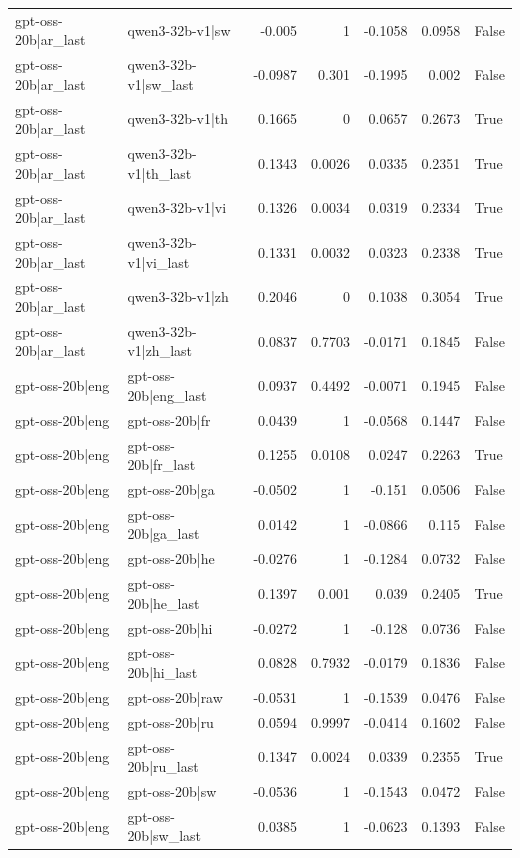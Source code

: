 \begin{table}
\begin{tabular}{l l r r r r l}
gpt-oss-20b|ar_last & qwen3-32b-v1|sw & -0.005 & 1 & -0.1058 & 0.0958 & False \\
gpt-oss-20b|ar_last & qwen3-32b-v1|sw_last & -0.0987 & 0.301 & -0.1995 & 0.002 & False \\
gpt-oss-20b|ar_last & qwen3-32b-v1|th & 0.1665 & 0 & 0.0657 & 0.2673 & True \\
gpt-oss-20b|ar_last & qwen3-32b-v1|th_last & 0.1343 & 0.0026 & 0.0335 & 0.2351 & True \\
gpt-oss-20b|ar_last & qwen3-32b-v1|vi & 0.1326 & 0.0034 & 0.0319 & 0.2334 & True \\
gpt-oss-20b|ar_last & qwen3-32b-v1|vi_last & 0.1331 & 0.0032 & 0.0323 & 0.2338 & True \\
gpt-oss-20b|ar_last & qwen3-32b-v1|zh & 0.2046 & 0 & 0.1038 & 0.3054 & True \\
gpt-oss-20b|ar_last & qwen3-32b-v1|zh_last & 0.0837 & 0.7703 & -0.0171 & 0.1845 & False \\
gpt-oss-20b|eng & gpt-oss-20b|eng_last & 0.0937 & 0.4492 & -0.0071 & 0.1945 & False \\
gpt-oss-20b|eng & gpt-oss-20b|fr & 0.0439 & 1 & -0.0568 & 0.1447 & False \\
gpt-oss-20b|eng & gpt-oss-20b|fr_last & 0.1255 & 0.0108 & 0.0247 & 0.2263 & True \\
gpt-oss-20b|eng & gpt-oss-20b|ga & -0.0502 & 1 & -0.151 & 0.0506 & False \\
gpt-oss-20b|eng & gpt-oss-20b|ga_last & 0.0142 & 1 & -0.0866 & 0.115 & False \\
gpt-oss-20b|eng & gpt-oss-20b|he & -0.0276 & 1 & -0.1284 & 0.0732 & False \\
gpt-oss-20b|eng & gpt-oss-20b|he_last & 0.1397 & 0.001 & 0.039 & 0.2405 & True \\
gpt-oss-20b|eng & gpt-oss-20b|hi & -0.0272 & 1 & -0.128 & 0.0736 & False \\
gpt-oss-20b|eng & gpt-oss-20b|hi_last & 0.0828 & 0.7932 & -0.0179 & 0.1836 & False \\
gpt-oss-20b|eng & gpt-oss-20b|raw & -0.0531 & 1 & -0.1539 & 0.0476 & False \\
gpt-oss-20b|eng & gpt-oss-20b|ru & 0.0594 & 0.9997 & -0.0414 & 0.1602 & False \\
gpt-oss-20b|eng & gpt-oss-20b|ru_last & 0.1347 & 0.0024 & 0.0339 & 0.2355 & True \\
gpt-oss-20b|eng & gpt-oss-20b|sw & -0.0536 & 1 & -0.1543 & 0.0472 & False \\
gpt-oss-20b|eng & gpt-oss-20b|sw_last & 0.0385 & 1 & -0.0623 & 0.1393 & False \\

\end{tabular}
\end{table}
